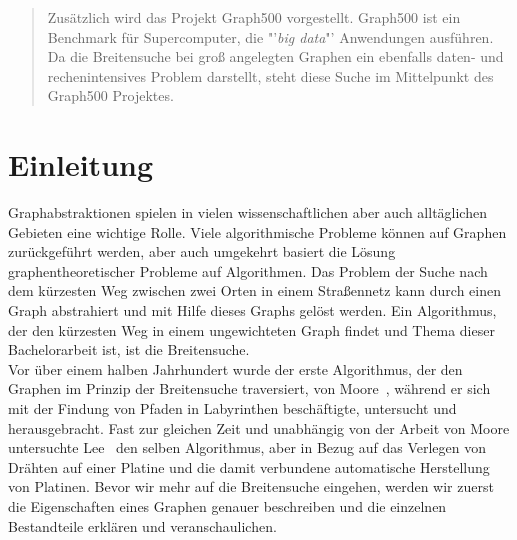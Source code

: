 \documentclass[11pt,a4paper]{article}
\begin{document}
\begin{abstract}
Zusätzlich wird das Projekt Graph500 vorgestellt. Graph500 ist ein Benchmark für Supercomputer, die "'\textit{big data}"' Anwendungen ausführen. Da die Breitensuche bei groß angelegten Graphen ein ebenfalls daten- und rechenintensives Problem darstellt, steht diese Suche im Mittelpunkt des Graph500 Projektes.
\end{abstract}
\clearpage
\section{Einleitung}
\label{sec:einleitung}
Graphabstraktionen spielen in vielen wissenschaftlichen aber auch alltäglichen Gebieten eine wichtige Rolle. Viele algorithmische Probleme können auf Graphen zurückgeführt werden, aber auch umgekehrt basiert die Lösung graphentheoretischer Probleme auf Algorithmen. Das Problem der Suche nach dem kürzesten Weg zwischen zwei Orten in einem Straßennetz kann durch einen Graph abstrahiert und mit Hilfe dieses Graphs gelöst werden. Ein Algorithmus, der den kürzesten Weg in einem ungewichteten Graph findet und Thema dieser Bachelorarbeit ist, ist die Breitensuche.\\
Vor über einem halben Jahrhundert wurde der erste Algorithmus, der den Graphen im Prinzip der Breitensuche traversiert, von Moore~\cite{moore}, während er sich mit der Findung von Pfaden in Labyrinthen beschäftigte, untersucht und herausgebracht. Fast zur gleichen Zeit und unabhängig von der Arbeit von Moore untersuchte Lee~\cite{lee} den selben Algorithmus, aber in Bezug auf das Verlegen von Drähten auf einer Platine und die damit verbundene automatische Herstellung von Platinen. Bevor wir mehr auf die Breitensuche eingehen, werden wir zuerst die Eigenschaften eines Graphen genauer beschreiben und die einzelnen Bestandteile erklären und veranschaulichen.
\end{document}
